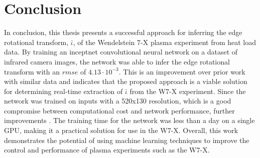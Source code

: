 %
\chapter{Conclusion}
\label{sec:conclusion}

In conclusion, this thesis presents a successful approach for inferring the edge rotational transform, $\bar{\iota}$, of the Wendelstein 7-X plasma experiment from heat load data. By training an inceptnet convolutional neural network on a dataset of infrared camera images, the network was able to infer the edge rotational transform with an $rmse$ of $4.13 \cdot 10^{-3}$. This is an improvement over prior work with similar data and indicates that the proposed approach is a viable solution for determining real-time extraction of $\bar{\iota}$ from the W7-X experiment. Since the network was trained on inputs with a 520x130 resolution, which is a good compromise between computational cost and network performance, further improvements . The training time for the network was less than a day on a single GPU, making it a practical solution for use in the W7-X. Overall, this work demonstrates the potential of using machine learning techniques to improve the control and performance of plasma experiments such as the W7-X.